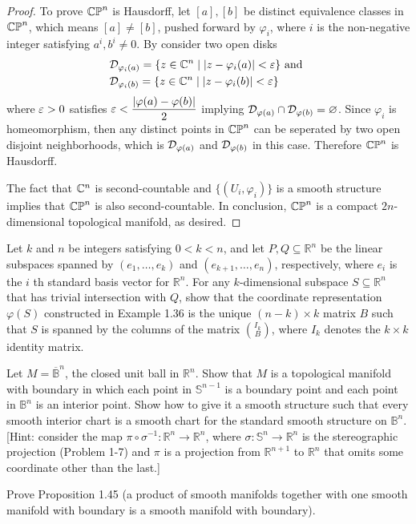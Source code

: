 \begin{proof}
    To prove $\mathbb{CP}^n$ is Hausdorff, let $[a],[b]$ be distinct equivalence classes in $\mathbb{CP}^n$, which means $[a] \neq [b]$, pushed forward by $\varphi_i$, where $i$ is the non-negative integer satisfying $a^i, b^i \neq 0$. By consider two open disks 
    \begin{align*}
        &\mathcal{D}_{\varphi_i(a)} = \{z \in \mathbb{C}^n \mid |z - \varphi_i(a)| < \varepsilon\} \text{ and }\\
        &\mathcal{D}_{\varphi_i(b)} = \{z \in \mathbb{C}^n \mid |z - \varphi_i(b)| < \varepsilon\}
    \end{align*}
    where $\varepsilon > 0$ satisfies $\varepsilon < \dfrac{|\varphi(a) - \varphi(b)|}{2}$ implying $\mathcal{D}_{\varphi(a)} \cap \mathcal{D}_{\varphi(b)} = \varnothing$. Since $\varphi_i$ is homeomorphism, then any distinct points in $\mathbb{CP}^n$ can be seperated by two open disjoint neighborhoods, which is $\mathcal{D}_{\varphi(a)}$ and $\mathcal{D}_{\varphi(b)}$ in this case. Therefore $\mathbb{CP}^n$ is Hausdorff.

    The fact that $ \mathbb{C}^n$ is second-countable and $\{(U_i,\varphi_i)\}$ is a smooth structure implies that $\mathbb{CP}^n$ is also second-countable. In conclusion, $\mathbb{CP}^n$ is a compact $2 n$-dimensional topological manifold, as desired.
    

\end{proof}
\begin{problem}
     Let $k$ and $n$ be integers satisfying $0<k<n$, and let $P, Q \subseteq \mathbb{R}^n$ be the linear subspaces spanned by $\left(e_1, \ldots, e_k\right)$ and $\left(e_{k+1}, \ldots, e_n\right)$, respectively, where $e_i$ is the $i$ th standard basis vector for $\mathbb{R}^n$. For any $k$-dimensional subspace $S \subseteq \mathbb{R}^n$ that has trivial intersection with $Q$, show that the coordinate representation $\varphi(S)$ constructed in Example 1.36 is the unique $(n-k) \times k$ matrix $B$ such that $S$ is spanned by the columns of the matrix $\binom{I_k}{B}$, where $I_k$ denotes the $k \times k$ identity matrix.
\end{problem}
\begin{problem}
    Let $M=\overline{\mathbb{B}}^n$, the closed unit ball in $\mathbb{R}^n$. Show that $M$ is a topological manifold with boundary in which each point in $\mathbb{S}^{n-1}$ is a boundary point and each point in $\mathbb{B}^n$ is an interior point. Show how to give it a smooth structure such that every smooth interior chart is a smooth chart for the standard smooth structure on $\mathbb{B}^n$. [Hint: consider the map $\pi \circ \sigma^{-1}: \mathbb{R}^n \rightarrow \mathbb{R}^n$, where $\sigma: \mathbb{S}^n \rightarrow \mathbb{R}^n$ is the stereographic projection (Problem 1-7) and $\pi$ is a projection from $\mathbb{R}^{n+1}$ to $\mathbb{R}^n$ that omits some coordinate other than the last.]    
\end{problem}
\begin{problem}
    Prove Proposition 1.45 (a product of smooth manifolds together with one smooth manifold with boundary is a smooth manifold with boundary).
\end{problem}